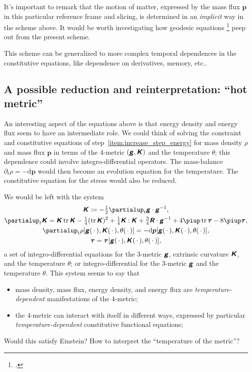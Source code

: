 \documentclass[\ifafour a4paper,12pt,\else a5paper,10pt,\fi%
onecolumn,oneside,article,%
british%
]{memoir}
\theoremstyle{remark}
\theoremstyle{innote}
\newcommand*{\mathte}[1]{\textbf{\textit{\textsf{#1}}}}
\newcommand*{\citep}{\footcites}%
\newcommand*{\de}{\partialup}%
\newcommand*{\pu}{\piup}%
\newcommand*{\di}{\mathrm{d}}%
\DeclareMathOperator{\tr}{tr}%
\newcommand*{\defd}{\coloneqq}
\newcommand*{\dotv}{\mathord{\,\cdot\,}}%
\newcommand*{\con}{\mathbin{:}}%
\renewcommand*{\|}{\nonscript\,\vert\nonscript\;\mathopen{}}
\newcommand*{\etc}{{etc.}}
\newcommand*{\ydd}{\rho}
\newcommand*{\yd}{\ydd}
\newcommand*{\yjj}{p}
\newcommand*{\yj}{\bm{\yjj}}
\newcommand*{\yTT}{\tau}
\newcommand*{\yT}{\bm{\yTT}}
\newcommand*{\ygg}{g}
\newcommand*{\yg}{\mathte{\ygg}}
\newcommand*{\yKK}{K}
\newcommand*{\yK}{\mathte{\yKK}}
\newcommand*{\yRR}{R}
\newcommand*{\yR}{\mathte{\yRR}}
\newcommand*{\yte}{\theta}
\begin{document}
It's important to remark that the motion of matter, expressed by the mass
flux $\yj$ in this particular reference frame and slicing, is determined
in an \emph{implicit} way in the scheme above. It would be worth
investigating how geodesic equations \citep{gerochetal1975,weatherall2011}
peep out from the present scheme.

This scheme can be generalized to more complex temporal dependences in the
constitutive equations, like dependence on derivatives, memory, \etc.

\subsection{A possible reduction and reinterpretation: \enquote{hot metric}}
\label{sec:reinterpretation_metric_temp}

An interesting aspect of the equations above is that energy density and
energy flux seem to have an intermediate role. We could think of solving
the constraint and constitutive equations of
step~\ref{item:increase_step_energy} for mass density $\yd$ and mass flux
$\yj$ in terms of the 4-metric $(\yg, \yK)$ and the temperature $\yte$;
this dependence could involve integro-differential operators. The
mass-balance $\de_t\yd = -\di\yj$ would then become an evolution equation
for the temperature. The constitutive equation for the stress would also be
reduced.

We would be left with the system
\begin{subequations}\label{eq:evolution_eqns_new}
  \begin{gather}
    \label{eq:dt_metric_new}
    \yK \defd -\tfrac{1}{2}\de_t \yg \cdot \yg^{-1},
    \\
    \label{eq:dt_curvat_new}
    \de_t \yK =  \yK\tr\yK
                - \tfrac{1}{4} (\tr\yK)^2
                +\tfrac{1}{4}\yK\con\yK
                + \tfrac{3}{4}\yR\cdot\yg^{-1} 
                + 4\pu\tr\yT - 8\pu\yT,
    \\
    \label{eq:constit_mass_new}
    \de_t \yd[\yg(\dotv),\yK(\dotv),\yte(\dotv)] = -\di\yj[\yg(\dotv),\yK(\dotv),\yte(\dotv)],
    \\
    \label{eq:constit_T_new}
    \yT = \yT[\yg(\dotv),\yK(\dotv),\yte(\dotv)],
  \end{gather}
\end{subequations}
a set of integro-differential equations for the 3-metric $\yg$,
extrinsic curvature $\yK$, and the temperature $\yte$; or integro-differential for
the 3-metric $\yg$ and the temperature $\yte$. This system seems to say
that
\begin{itemize}
\item mass density, mass flux, energy density, and energy flux are
  \emph{temperature-dependent} manifestations of the 4-metric;
\item the 4-metric can interact with itself in different ways, expressed by
  particular \emph{temperature-dependent} constitutive functional equations;
\end{itemize}
Would this satisfy Einstein? How to interpret the \enquote{temperature of
  the metric}?
\end{document}
